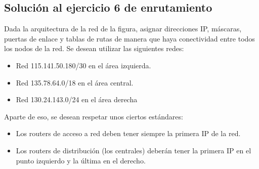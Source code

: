 \documentclass[letterpaper,10pt,spanish]{sphinxmanual}
\begin{document}
\subsection{Solución al ejercicio 6 de enrutamiento}
\label{\detokenize{t2_integracion_elementos/ejercicios_subredes_ipv4/ejercicios_dos_router:solucion-al-ejercicio-6-de-enrutamiento}}
\sphinxAtStartPar
Dada la arquitectura de la red de la figura, asignar direcciones IP, máscaras, puertas de enlace y tablas de rutas de manera que haya conectividad entre todos
los nodos de la red. Se desean utilizar las siguientes redes:
\begin{itemize}
\item {} 
\sphinxAtStartPar
Red 115.141.50.180/30 en el área izquierda.

\item {} 
\sphinxAtStartPar
Red 135.78.64.0/18 en el área central.

\item {} 
\sphinxAtStartPar
Red 130.24.143.0/24 en el área derecha

\end{itemize}

\begin{figure}[htbp]
\centering

\noindent{}
\end{figure}

\sphinxAtStartPar
Aparte de eso, se desean respetar unos ciertos estándares:
\begin{itemize}
\item {} 
\sphinxAtStartPar
Los routers de acceso a red deben tener siempre la primera IP de la red.

\item {} 
\sphinxAtStartPar
Los routers de distribución (los centrales) deberán tener la primera IP en el punto izquierdo y la última en el derecho.

\end{itemize}
\end{document}
